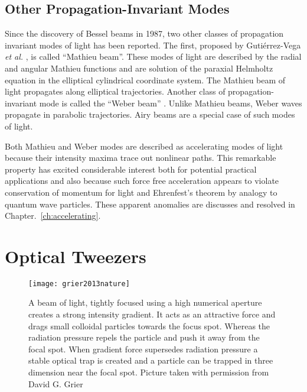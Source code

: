\subsection{Other Propagation-Invariant Modes}

Since the discovery of Bessel beams in 1987, two other classes of propagation invariant modes of light has been reported. The first, proposed by Gutiérrez-Vega \emph{et al.} \cite{Gutierrez-Vega:00}, is called ``Mathieu beam''. These modes of light are described by the radial and angular Mathieu functions and are solution of the paraxial Helmholtz equation in the elliptical cylindrical coordinate system. The Mathieu beam of light propagates along elliptical trajectories. Another class of propagation-invariant mode is called the ``Weber beam'' \cite{Bandres_2013}. Unlike Mathieu beams, Weber waves propagate in parabolic trajectories. Airy beams are a special case of such modes of light.

Both Mathieu and Weber modes are described as accelerating modes of light because their intensity maxima trace out nonlinear paths. This remarkable property has excited considerable interest both for potential practical applications and also because such force free acceleration appears to violate conservation of momentum for light and Ehrenfest's theorem by analogy to quantum wave particles. These apparent anomalies are discusses and resolved in Chapter.~\eqref{ch:accelerating}.

\section{Optical Tweezers}
\begin{figure}[t!]
  \centering
  \texttt{[image: grier2013nature]}
  \caption{A beam of light, tightly focused using a high numerical aperture creates a strong intensity gradient. It acts as an attractive force and drags small colloidal particles towards the focus spot. Whereas the radiation pressure repels the particle and push it away from the focal spot. When gradient force supersedes radiation pressure a stable optical trap is created and a particle can be trapped in three dimension near the focal spot. Picture taken with permission from David G. Grier \cite{grier2003nature}}
  \label{fig:Optical tweezers}
\end{figure}

